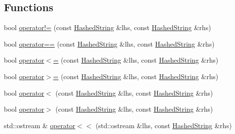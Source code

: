\subsection*{Functions}
\begin{DoxyCompactItemize}
\item 
bool \hyperlink{namespace_osiris_i_1_1_utilities_a50620a779c82a372f796c52d4689c039}{operator!=} (const \hyperlink{class_osiris_i_1_1_utilities_1_1_hashed_string}{Hashed\-String} \&lhs, const \hyperlink{class_osiris_i_1_1_utilities_1_1_hashed_string}{Hashed\-String} \&rhs)
\item 
bool \hyperlink{namespace_osiris_i_1_1_utilities_abcce4e24526f104c148e168810d13eea}{operator==} (const \hyperlink{class_osiris_i_1_1_utilities_1_1_hashed_string}{Hashed\-String} \&lhs, const \hyperlink{class_osiris_i_1_1_utilities_1_1_hashed_string}{Hashed\-String} \&rhs)
\item 
bool \hyperlink{namespace_osiris_i_1_1_utilities_af35fe84fa6e8d07cdc979d4366b7524b}{operator$<$=} (const \hyperlink{class_osiris_i_1_1_utilities_1_1_hashed_string}{Hashed\-String} \&lhs, const \hyperlink{class_osiris_i_1_1_utilities_1_1_hashed_string}{Hashed\-String} \&rhs)
\item 
bool \hyperlink{namespace_osiris_i_1_1_utilities_ab352f1b1f0a9cf75d1ac9bf0e97c5976}{operator$>$=} (const \hyperlink{class_osiris_i_1_1_utilities_1_1_hashed_string}{Hashed\-String} \&lhs, const \hyperlink{class_osiris_i_1_1_utilities_1_1_hashed_string}{Hashed\-String} \&rhs)
\item 
bool \hyperlink{namespace_osiris_i_1_1_utilities_a34cea40e9493fbb376d659af33799bf9}{operator$<$} (const \hyperlink{class_osiris_i_1_1_utilities_1_1_hashed_string}{Hashed\-String} \&lhs, const \hyperlink{class_osiris_i_1_1_utilities_1_1_hashed_string}{Hashed\-String} \&rhs)
\item 
bool \hyperlink{namespace_osiris_i_1_1_utilities_afdc26874cb06ae2109bd47ad9b2b45f2}{operator$>$} (const \hyperlink{class_osiris_i_1_1_utilities_1_1_hashed_string}{Hashed\-String} \&lhs, const \hyperlink{class_osiris_i_1_1_utilities_1_1_hashed_string}{Hashed\-String} \&rhs)
\item 
std\-::ostream \& \hyperlink{namespace_osiris_i_1_1_utilities_a3b6890ff75b4ab2d25c04dca9aae4889}{operator$<$$<$} (std\-::ostream \&lhs, const \hyperlink{class_osiris_i_1_1_utilities_1_1_hashed_string}{Hashed\-String} \&rhs)
\end{DoxyCompactItemize}


